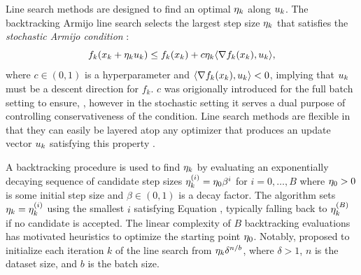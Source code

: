 Line search methods are designed to find an optimal $\eta_{k}$ along $u_{k}$. %
The backtracking Armijo line search selects the largest step size $\eta_{k}$ that satisfies the \textit{stochastic Armijo condition} \cite{vaswani2019painless}:
\begin{equation}
        f_k(x_{k} + \eta_{k} u_{k}) \le f_k(x_{k}) + c \eta_{k} \langle \nabla f_k(x_{k}), u_{k} \rangle,
    \label{eq:armijo_condition}
\end{equation}
where $c \in (0, 1)$ is a hyperparameter and $\langle \nabla f_k(x_{k}), u_{k} \rangle < 0$, implying that $u_{k}$ must be a descent direction for $f_k$. $c$ was origionally introduced for the full batch setting to ensure, %
\cite{nocedal2006numerical}, however in the stochastic setting it serves a dual purpose of controlling conservativeness of the condition. Line search methods are flexible in that they can easily be layered atop any optimizer that produces an update vector $u_{k}$ satisfying this property \cite{nocedal2006numerical,vaswani2025armijo,shea2024so}.

A backtracking procedure is used to find $\eta_{k}$ by evaluating an exponentially decaying sequence of candidate step sizes $\eta_{k}^{(i)} = \eta_0 \beta^i$ for $i = 0, \dots, B$ where $\eta_0 > 0$ is some initial step size and $\beta \in (0, 1)$ is a decay factor. The algorithm sets $\eta_{k} = \eta_{k}^{(i)}$ using the smallest $i$ satisfying Equation , typically falling back to $\eta_{k}^{(B)}$ if no candidate is accepted. The linear complexity of $B$ backtracking evaluations has motivated heuristics to optimize the starting point $\eta_0$. Notably, \cite{vaswani2019painless} proposed to initialize each iteration $k$ of the line search from $\eta_{k} \delta^{n/b}$, where $\delta > 1$, $n$ is the dataset size, and $b$ is the batch size.

